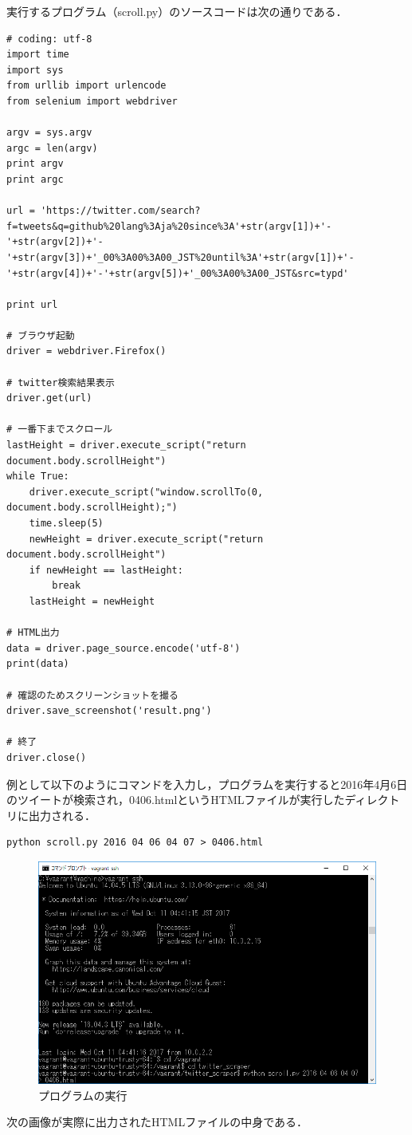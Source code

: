 \newpage
実行するプログラム（scroll.py）のソースコードは次の通りである．
\begin{lstlisting}[breaklines = true, basicstyle=\ttfamily\footnotesize, frame=single]
# coding: utf-8
import time
import sys
from urllib import urlencode
from selenium import webdriver

argv = sys.argv
argc = len(argv)
print argv
print argc

url = 'https://twitter.com/search?f=tweets&q=github%20lang%3Aja%20since%3A'+str(argv[1])+'-'+str(argv[2])+'-'+str(argv[3])+'_00%3A00%3A00_JST%20until%3A'+str(argv[1])+'-'+str(argv[4])+'-'+str(argv[5])+'_00%3A00%3A00_JST&src=typd'

print url

# ブラウザ起動
driver = webdriver.Firefox()

# twitter検索結果表示
driver.get(url)

# 一番下までスクロール
lastHeight = driver.execute_script("return document.body.scrollHeight")
while True:
    driver.execute_script("window.scrollTo(0, document.body.scrollHeight);")
    time.sleep(5)
    newHeight = driver.execute_script("return document.body.scrollHeight")
    if newHeight == lastHeight:
        break
    lastHeight = newHeight
    
# HTML出力
data = driver.page_source.encode('utf-8')
print(data)

# 確認のためスクリーンショットを撮る
driver.save_screenshot('result.png')

# 終了
driver.close()

\end{lstlisting}
\newpage
例として以下のようにコマンドを入力し，プログラムを実行すると2016年4月6日のツイートが検索され，0406.htmlというHTMLファイルが実行したディレクトリに出力される．
\begin{lstlisting}[basicstyle=\ttfamily\footnotesize, frame=single]
python scroll.py 2016 04 06 04 07 > 0406.html
\end{lstlisting}

\begin{figure}[htb]
\centering
\includegraphics[width=13cm]{img/0406.png}
\caption{プログラムの実行}
\end{figure}
\newpage
次の画像が実際に出力されたHTMLファイルの中身である．

